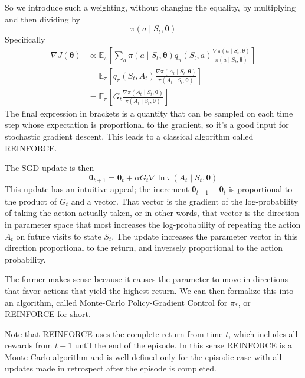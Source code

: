 \documentclass[11pt]{article}
\theoremstyle{plain} %
\theoremstyle{remark}
\begin{document}
So we introduce such a weighting, without changing the equality, by
  multiplying and then dividing by
$$
\pi\left(a \mid S_{t}, \boldsymbol{\theta}\right)
$$
Specifically
$$
\begin{aligned}
\nabla J(\boldsymbol{\theta}) & \propto \mathbb{E}_{\pi}\left[\sum_{a} \pi\left(a \mid S_{t}, \boldsymbol{\theta}\right) q_{\pi}\left(S_{t}, a\right) \frac{\nabla \pi\left(a \mid S_{t}, \boldsymbol{\theta}\right)}{\pi\left(a \mid S_{t}, \boldsymbol{\theta}\right)}\right] \\
& =\mathbb{E}_{\pi}\left[q_{\pi}\left(S_{t}, A_{t}\right) \frac{\nabla \pi\left(A_{t} \mid S_{t}, \boldsymbol{\theta}\right)}{\pi\left(A_{t} \mid S_{t}, \boldsymbol{\theta}\right)}\right] \\
& =\mathbb{E}_{\pi}\left[G_{t} \frac{\nabla \pi\left(A_{t} \mid S_{t}, \boldsymbol{\theta}\right)}{\pi\left(A_{t} \mid S_{t}, \boldsymbol{\theta}\right)}\right]
\end{aligned}
$$
 The final expression in brackets is a quantity that can be sampled on
  each time step whose expectation is proportional to the gradient, so it's a
  good input for stochastic gradient descent. This leads to a classical algorithm called REINFORCE.

The SGD update is then
$$
\boldsymbol{\theta}_{t+1}=\boldsymbol{\theta}_{t}+\alpha G_{t} \nabla \ln \pi\left(A_{t} \mid S_{t}, \boldsymbol{\theta}\right)
$$
This update has an intuitive appeal; the increment
  $\boldsymbol{\theta}_{t+1}-\boldsymbol{\theta}_{t}$ is proportional to the
  product of $G_{t}$ and a vector. That vector is the gradient of the log-probability of taking the action
  actually taken, or in other words, that vector is the direction in parameter
  space that most increases the log-probability of repeating the action $A_{t}$
  on future visits to state $S_{t}$. The update increases the parameter vector in this direction proportional
  to the return, and inversely proportional to the action probability. 
  
  The former makes sense because it causes the parameter to move in
  directions that favor actions that yield the highest return. We can then formalize this into an algorithm, called Monte-Carlo
  Policy-Gradient Control for $\pi_{*}$, or REINFORCE for short.

  Note that REINFORCE uses the complete return from time $t$, which
  includes all rewards from $t+1$ until the end of the episode. In this sense REINFORCE is a Monte Carlo algorithm and is well defined
  only for the episodic case with all updates made in retrospect after the
  episode is completed.
\end{document}
